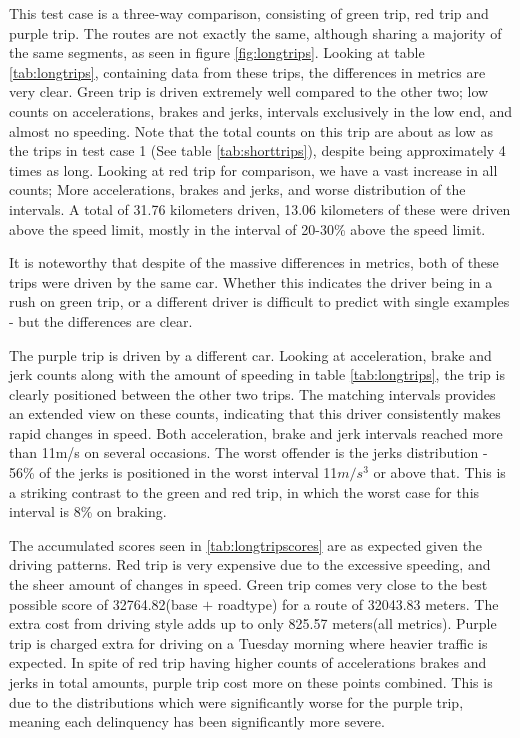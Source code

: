 This test case is a three-way comparison, consisting of green trip, red trip and purple trip. The routes are not exactly the same, although sharing a majority of the same segments, as seen in figure \ref{fig:longtrips}. Looking at table \ref{tab:longtrips}, containing data from these trips, the differences in metrics are very clear. Green trip is driven extremely well compared to the other two; low counts on accelerations, brakes and jerks, intervals exclusively in the low end, and almost no speeding. Note that the total counts on this trip are about as low as the trips in test case 1 (See table \ref{tab:shorttrips}), despite being approximately 4 times as long.
Looking at red trip for comparison, we have a vast increase in all counts; More accelerations, brakes and jerks, and worse distribution of the intervals. A total of 31.76 kilometers driven, 13.06 kilometers of these were driven above the speed limit, mostly in the interval of 20-30\% above the speed limit.

It is noteworthy that despite of the massive differences in metrics, both of these trips were driven by the same car. Whether this indicates the driver being in a rush on green trip, or a different driver is difficult to predict with single examples - but the differences are clear.

The purple trip is driven by a different car. Looking at acceleration, brake and jerk counts along with the amount of speeding in table \ref{tab:longtrips}, the trip is clearly positioned between the other two trips. The matching intervals provides an extended view on these counts, indicating that this driver consistently makes rapid changes in speed. Both acceleration, brake and jerk intervals reached more than 11m/s on several occasions. The worst offender is the jerks distribution - 56\% of the jerks is positioned in the worst interval 11$m/s^3$ or above that. This is a striking contrast to the green and red trip, in which the worst case for this interval is 8\% on braking.

The accumulated scores seen in \ref{tab:longtripscores} are as expected given the driving patterns. Red trip is very expensive due to the excessive speeding, and the sheer amount of changes in speed. Green trip comes very close to the best possible score of 32764.82(base $+$ roadtype) for a route of 32043.83 meters. The extra cost from driving style adds up to only 825.57 meters(all metrics). Purple trip is charged extra for driving on a Tuesday morning where heavier traffic is expected. In spite of red trip having higher counts of accelerations brakes and jerks in total amounts, purple trip cost more on these points combined. This is due to the distributions which were significantly worse for the purple trip, meaning each delinquency has been significantly more severe.

